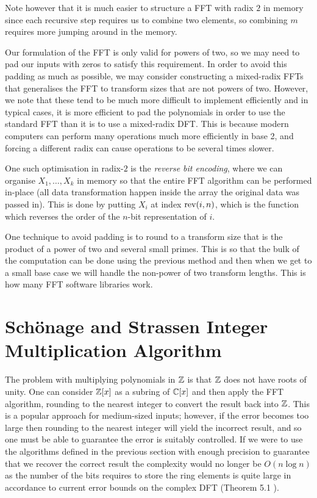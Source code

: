 \medskip

Note however that it is much easier to structure a FFT with radix $2$ in memory since each recursive step requires us to combine two elements, so combining $m$ requires more jumping around in the memory. 


\begin{remark}

    Our formulation of the FFT is only valid for powers of two, so we may need to pad our inputs with zeros to satisfy this requirement. In order to avoid this padding as much as possible, we may consider constructing a mixed-radix FFTs that generalises the FFT to transform sizes that are not powers of two. However, we note that these tend to be much more difficult to implement efficiently and in typical cases, it is more efficient to pad the polynomials in order to use the standard FFT than it is to use a mixed-radix DFT. This is because modern computers can perform many operations much more efficiently in base 2, and forcing a different radix can cause operations to be several times slower.

    One such optimisation in radix-$2$ is the \emph{reverse bit encoding}, where we can organise $X_1, \ldots, X_k$ in memory so that the entire FFT algorithm can be performed in-place (all data transformation happen inside the array the original data was passed in). This is done by putting $X_i$ at index $\textrm{rev}(i, n)$, which is the function which reverses the order of the $n$-bit representation of $i$.

    One technique to avoid padding is to round to a transform size that is the product of a power of two and several small primes.
    This is so that the bulk of the computation can be done using the previous method and then when we get to a small base case we will handle the non-power of two transform lengths. This is how many FFT software libraries work.
\end{remark}


\section{Sch\"{o}nage and Strassen Integer Multiplication Algorithm}
\label{sec:schon-strass}

The problem with multiplying polynomials in ${\mathbb Z}$ is that ${\mathbb Z}$ does not have roots of unity. One can consider ${\mathbb Z}[x]$ as a subring of ${\mathbb C}[x]$ and then apply the FFT algorithm, rounding to the nearest integer to convert the result back into ${\mathbb Z}$. This is a popular approach for medium-sized inputs; however, if the error becomes too large then rounding to the nearest integer will yield the incorrect result, and so one must be able to guarantee the error is suitably controlled. If we were to use the algorithms defined in the previous section with enough precision to guarantee that we recover the correct result the complexity would no longer be $O(n \log n)$ as the number of the bits requires to store the ring elements is quite large in accordance to current error bounds on the complex DFT (Theorem 5.1 \cite{fft-error}).

